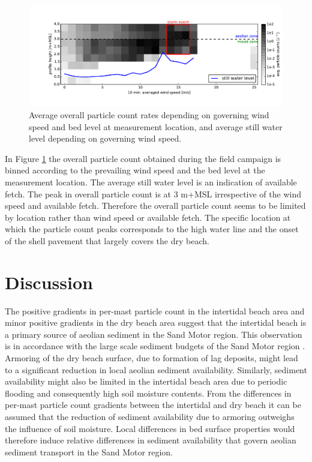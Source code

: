 \begin{figure}
 \centering
  \includegraphics[width=\columnwidth]{../Figures/particlecounts_velocities}
  \caption{Average overall particle count rates depending on governing
    wind speed and bed level at measurement location, and average
    still water level depending on governing wind speed.}
  \label{fig:pc_velocity}
\end{figure}

In Figure \ref{fig:pc_velocity} the overall particle count obtained
during the field campaign is binned according to the prevailing wind
speed and the bed level at the measurement location. The average still
water level is an indication of available fetch. The peak in overall
particle count is at 3 m+MSL irrespective of the wind speed and
available fetch. Therefore the overall particle count seems to be
limited by location rather than wind speed or available fetch. The
specific location at which the particle count peaks corresponds to the
high water line and the onset of the shell pavement that largely
covers the dry beach.

\section{Discussion}

The positive gradients in per-mast particle count in the intertidal
beach area and minor positive gradients in the dry beach area suggest
that the intertidal beach is a primary source of aeolian sediment in
the Sand Motor region. This observation is in accordance with the
large scale sediment budgets of the Sand Motor region
\citep{Hoonhout2017a}. Armoring of the dry beach surface, due to
formation of lag deposits, might lead to a significant reduction in
local aeolian sediment availability. Similarly, sediment availability
might also be limited in the intertidal beach area due to periodic
flooding and consequently high soil moisture contents. From the
differences in per-mast particle count gradients between the
intertidal and dry beach it can be assumed that the reduction of
sediment availability due to armoring outweighs the influence of soil
moisture. Local differences in bed surface properties would therefore
induce relative differences in sediment availability that govern
aeolian sediment transport in the Sand Motor region.


